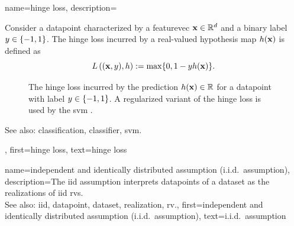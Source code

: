 {name={hinge loss}, 
	description={Consider a \gls{datapoint} 
		characterized by a \gls{featurevec} ${\bf x} \in \mathbb{R}^{d}$ and a 
		binary \gls{label} $y \in \{-1,1\}$. The hinge \gls{loss} incurred by a real-valued 
		\gls{hypothesis} \gls{map} $h({\bf x})$ is defined as 
		\begin{equation} 
			\label{equ_hinge_loss_gls_dict}
				L\left(({\bf x},y),h \right) := \max \{ 0 , 1 - y h({\bf x}) \}. 
			\end{equation}
\begin{figure}[H]
\begin{center}
\caption{The hinge \gls{loss} incurred by the \gls{prediction} $h({\bf x}) \in \mathbb{R}$ 
for a \gls{datapoint} with \gls{label} $y \in \{-1,1\}$. A regularized variant of the hinge 
\gls{loss} is used by the \gls{svm} \cite{LampertNowKernel}.}
\label{fig_hingeloss_dict}
\end{center}
\end{figure} 	    
		See also:  \gls{classification}, \gls{classifier}, \gls{svm}.},
	first={hinge loss},
	text={hinge loss}
}

{name={independent and identically distributed assumption (i.i.d.\ assumption)}, 
	description={The \gls{iid} assumption interprets \glspl{datapoint} of a \gls{dataset} as the 
		\glspl{realization} of \gls{iid} \glspl{rv}.
				\\
		See also: \gls{iid}, \gls{datapoint}, \gls{dataset}, \gls{realization}, \gls{rv}.},
	first={independent and identically distributed assumption (i.i.d.\ assumption)},
	text={i.i.d.\ assumption} 
}

